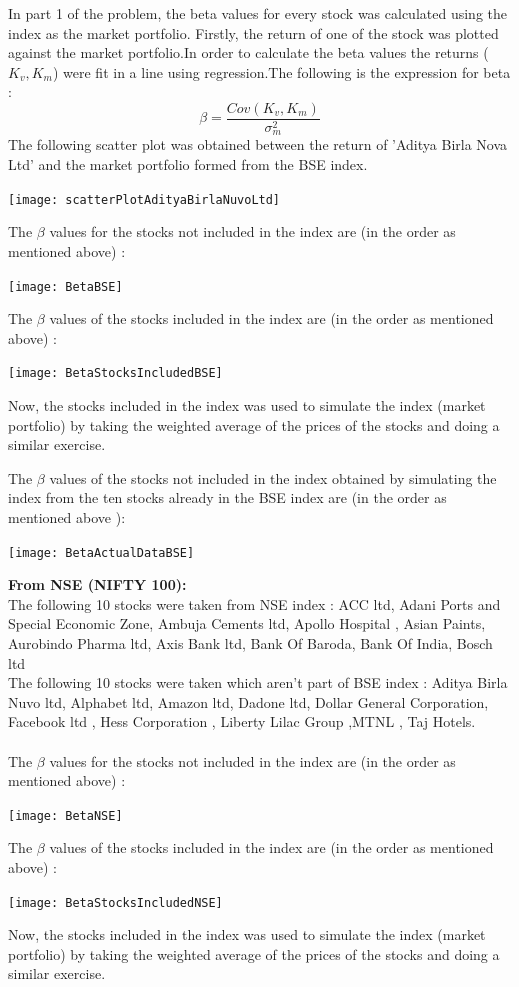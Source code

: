 \documentclass{article}
\begin{document}
In part 1 of the problem, the beta values for every stock was calculated using the index as the market portfolio. Firstly, the return of one of the stock was plotted against the market portfolio.In order to calculate the beta values the returns ($K_{v} , K_{m}$) were fit in a line using regression.The following is the expression for beta :
$$\beta = \frac{Cov(K_{v},K_{m})}{\sigma_{m}^{2}}$$
The following scatter plot was obtained between the return of 'Aditya Birla Nova Ltd' and the market portfolio formed from the BSE index. 
\begin{center}
\texttt{[image: scatterPlotAdityaBirlaNuvoLtd]}
\end{center}
The $\beta$ values for the stocks not included in the index are (in the order as mentioned above) :\\
\begin{center}
\texttt{[image: BetaBSE]}
\end{center}
The $\beta$ values of the stocks included in the index are (in the order as mentioned above) :\\
\begin{center}
\texttt{[image: BetaStocksIncludedBSE]}
\end{center}
Now, the stocks included in the index was used to simulate the index (market portfolio) by taking the weighted average of the prices of the stocks and doing a similar exercise.

The $\beta$ values of the stocks not included in the index obtained by simulating the index from the ten stocks already in the BSE index are (in the order as mentioned above ):\\
\begin{center}
\texttt{[image: BetaActualDataBSE]}
\end{center}

\newpage
\textbf{From NSE (NIFTY 100):}\\
The following 10 stocks were taken from NSE index : ACC ltd, Adani Ports and Special Economic Zone, Ambuja Cements ltd, Apollo Hospital , Asian Paints, Aurobindo Pharma ltd, Axis Bank ltd, Bank Of Baroda, Bank Of India, Bosch ltd\\
The following 10 stocks were taken which aren't part of BSE index : Aditya Birla Nuvo ltd, Alphabet ltd, Amazon ltd, Dadone ltd, Dollar General Corporation, Facebook ltd , Hess Corporation , Liberty Lilac Group ,MTNL , Taj Hotels.\\\\
The $\beta$ values for the stocks not included in the index are (in the order as mentioned above) :\\
\begin{center}
\texttt{[image: BetaNSE]}
\end{center}
The $\beta$ values of the stocks included in the index are (in the order as mentioned above) :\\
\begin{center}
\texttt{[image: BetaStocksIncludedNSE]}
\end{center}
Now, the stocks included in the index was used to simulate the index (market portfolio) by taking the weighted average of the prices of the stocks and doing a similar exercise.
\end{document}
